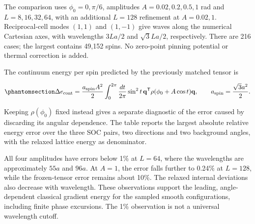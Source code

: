 The comparison uses \(\phi_0=0,\pi/6\), amplitudes \(A=0.02,0.2,0.5,1\)
rad and \(L=8,16,32,64\), with an additional \(L=128\) refinement at
\(A=0.02,1\). Reciprocal-cell modes \((1,1)\) and \((1,-1)\) give waves
along the numerical Cartesian axes, with wavelengths \(3La/2\) and
\(\sqrt{3}La/2\), respectively. There are 216 cases; the largest
contains 49,152 spins. No zero-point pinning potential or thermal
correction is added.

The continuum energy per spin predicted by the previously matched tensor
is

\begin{equation}\phantomsection\label{eq-nbcp-y-nonlinear-energy}{
\Delta e_{\rm cont}=\frac{a_{\rm spin}A^2}{2}
\int_0^{2\pi}\frac{dt}{2\pi}\sin^2t\,
\mathbf q^{\mathsf T}\rho(\phi_0+A\cos t)\mathbf q,
\qquad a_{\rm spin}=\frac{\sqrt{3}a^2}{2}.
}\end{equation}

Keeping \(\rho(\phi_0)\) fixed instead gives a separate diagnostic of
the error caused by discarding its angular dependence. The table reports
the largest absolute relative energy error over the three SOC pairs, two
directions and two background angles, with the relaxed lattice energy as
denominator.

All four amplitudes have errors below 1\% at \(L=64\), where the
wavelengths are approximately \(55a\) and \(96a\). At \(A=1\), the error
falls further to 0.24\% at \(L=128\), while the frozen-tensor error
remains about 10\%. The relaxed internal deviations also decrease with
wavelength. These observations support the leading, angle-dependent
classical gradient energy for the sampled smooth configurations,
including finite phase excursions. The 1\% observation is not a
universal wavelength cutoff.

